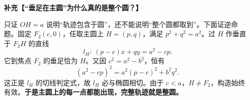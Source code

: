 \begin{proofbox}
\medskip
\textbf{补充【“垂足在主圆”为什么真的是整个圆？】}

只证 $OH=a$ 说明“轨迹包含于圆”，还不能说明“整个圆都取到”。下面证逆命题。固定 $F_2(c,0)$，任取主圆上 $H=(p,q)$，满足 $p^2+q^2=a^2$。过 $H$ 作垂直于 $F_2H$ 的直线
\[
l_H:\ (p-c)x+qy=a^2-cp.
\]
它到焦点 $F_2$ 的垂足恰为 $H$。又因 $c^2=a^2-b^2$，恒有
\[
(a^2-cp)^2=a^2(p-c)^2+b^2q^2.
\]
这正是 $l_H$ 的切线判定式，故 $l_H$ 必与椭圆相切。由于 $c<a$，$H\ne F_2$，构造始终有效。\textbf{于是主圆上的每一点都能出现，完整轨迹就是整圆。}
\end{proofbox}
